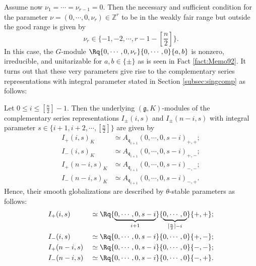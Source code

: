 Assume now $\nu_1 = \cdots = \nu_{r-1}=0$.  
Then the necessary and sufficient condition 
 for the parameter
 $\nu=(0,\cdots,0,\nu_r) \in {\mathbb{Z}}^r$ 
 to be in the weakly fair range 
 but outside the good range
 is given by 
\[
   \nu_r \in \{-1,-2, \cdots, r-1-[\frac n 2]\}.  
\]
In this case, 
 the $G$-module $\Rq{0,\cdots,0,\nu_r}{0,\cdots,0}{a, b}$ is nonzero,
 irreducible, 
 and unitarizable for $a,b \in \{\pm\}$
 as is seen in Fact \ref{fact:Memo92}. 
It turns out that these very parameters give rise to the complementary series representations
 with integral parameter stated in Section \ref{subsec:singcomp} as follows:
\begin{theorem}
\label{thm:compint}
Let $0 \le i \le [\frac n 2]-1$.  
Then the underlying $({\mathfrak{g}},K)$-modules
 of the
 complementary series representations $I_\pm(i,s)$ and $I_\pm(n-i,s)$
 with integral parameter
 $s \in \{i+1,i+2, \cdots, [\frac n 2]\}$ are given by
\begin{align*}
  I_+(i,s)_K
  &\simeq
  A_{{\mathfrak{q}}_{i+1}}(0,\cdots,0,s-i)_{+,+};
\\
  I_-(i,s)_K
  &\simeq
  A_{{\mathfrak{q}}_{i+1}}(0,\cdots,0,s-i)_{+,-};
\\
  I_+(n-i,s)_K
  &\simeq
  A_{{\mathfrak{q}}_{i+1}}(0,\cdots,0,s-i)_{-,-};
\\
  I_-(n-i,s)_K
  &\simeq
  A_{{\mathfrak{q}}_{i+1}}(0,\cdots,0,s-i)_{-,+}.  
\end{align*}
Hence,
 their smooth globalizations are described
 by $\theta$-stable parameters as follows:
\begin{alignat*}{2}
   &I_+(i,s) 
   &&\simeq \Rq{\underbrace{0,\cdots,0,s-i}_{i+1}}{\underbrace{0,\cdots,0}_{[\frac n 2]-i}}{+,+};
\\
&I_-(i,s) 
   &&\simeq \Rq{0,\cdots,0,s-i}{0,\cdots,0}{+,-};
\\
&I_+(n-i,s) 
   &&\simeq \Rq{0,\cdots,0,s-i}{0,\cdots,0}{-,-};
\\
&I_-(n-i,s) 
   &&\simeq \Rq{0,\cdots,0,s-i}{0,\cdots,0}{-,+}.  
\end{alignat*} 
\end{theorem}

